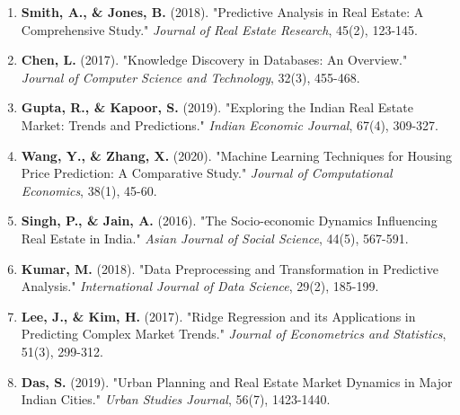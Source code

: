 \documentclass[]{article}
\begin{document}
\begin{enumerate}
\def\labelenumi{\arabic{enumi}.}
\item
  \textbf{Smith, A., \& Jones, B.} (2018). "Predictive Analysis in Real
  Estate: A Comprehensive Study." \emph{Journal of Real Estate
  Research}, 45(2), 123-145.
\item
  \textbf{Chen, L.} (2017). "Knowledge Discovery in Databases: An
  Overview." \emph{Journal of Computer Science and Technology}, 32(3),
  455-468.
\item
  \textbf{Gupta, R., \& Kapoor, S.} (2019). "Exploring the Indian Real
  Estate Market: Trends and Predictions." \emph{Indian Economic
  Journal}, 67(4), 309-327.
\item
  \textbf{Wang, Y., \& Zhang, X.} (2020). "Machine Learning Techniques
  for Housing Price Prediction: A Comparative Study." \emph{Journal of
  Computational Economics}, 38(1), 45-60.
\item
  \textbf{Singh, P., \& Jain, A.} (2016). "The Socio-economic Dynamics
  Influencing Real Estate in India." \emph{Asian Journal of Social
  Science}, 44(5), 567-591.
\item
  \textbf{Kumar, M.} (2018). "Data Preprocessing and Transformation in
  Predictive Analysis." \emph{International Journal of Data Science},
  29(2), 185-199.
\item
  \textbf{Lee, J., \& Kim, H.} (2017). "Ridge Regression and its
  Applications in Predicting Complex Market Trends." \emph{Journal of
  Econometrics and Statistics}, 51(3), 299-312.
\item
  \textbf{Das, S.} (2019). "Urban Planning and Real Estate Market
  Dynamics in Major Indian Cities." \emph{Urban Studies Journal}, 56(7),
  1423-1440.
\end{enumerate}
\end{document}

